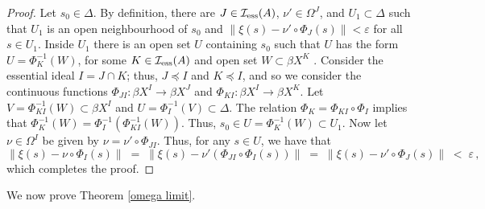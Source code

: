 \documentclass{amsart}
\theoremstyle{definition}
\theoremstyle{remark}
\begin{document}
\begin{proof}
Let $s_0\in\Delta$. By definition, there are
$J\in \mathcal I_{\rm ess}(A)$, $\nu'\in\Omega^J$, and $U_1\subset\Delta$ such that $U_1$ is an open neighbourhood of $s_0$ and
$\|\xi(s)-\nu'\circ\Phi_J(s)\|<\varepsilon$ for all $s\in U_1$. Inside $U_1$ there is an open set $U$ containing $s_0$ such that $U$ has the
form $U=\Phi_{K}^{-1}(W)$, for some $K\in \mathcal I_{\rm ess}(A)$ and open set $W\subset \beta X^K$
\cite[Proposition 2.3 in Appendix Two]{Dugundji-book}. Consider the essential ideal $I=J\cap K$; thus,
$J\preccurlyeq I$ and $K\preccurlyeq I$, and so we consider the continuous functions
$\Phi_{JI}:\beta X^I\rightarrow\beta X^J$ and $\Phi_{KI}:\beta X^I\rightarrow\beta X^K$. Let $V=\Phi_{KI}^{-1}(W)\subset\beta X^I$
and $U=\Phi_I^{-1}(V)\subset\Delta$. The relation $\Phi_K=\Phi_{KI}\circ\Phi_I$ implies that
$\Phi_{K}^{-1}(W)=\Phi_I^{-1}\left( \Phi_{KI}^{-1}(W)\right)$. Thus, $s_0\in U=\Phi_K^{-1}(W)\subset U_1$. Now let $\nu\in\Omega^I$
be given by $\nu=\nu'\circ\Phi_{JI}$. Thus, for any $s\in U$, we have that
\[
\|\xi(s)-\nu\circ\Phi_I(s)\|\;=\;\|\xi(s)-\nu'\left(\Phi_{JI}\circ\Phi_I(s)\right)\|\;=\;\|\xi(s)-\nu'\circ\Phi_{J}(s)\|\;<\;\varepsilon\,,
\]
which completes the proof.
\end{proof}

We now prove Theorem \ref{omega limit}.
\end{document}
